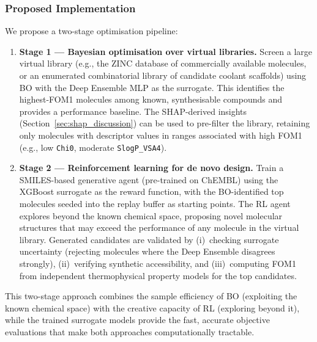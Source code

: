 \documentclass[11pt,a4paper]{article}
\begin{document}
\subsubsection{Proposed Implementation}

We propose a two-stage optimisation pipeline:
\begin{enumerate}
    \item \textbf{Stage 1 --- Bayesian optimisation over virtual libraries.} Screen a large virtual library (e.g., the ZINC database of commercially available molecules, or an enumerated combinatorial library of candidate coolant scaffolds) using BO with the Deep Ensemble MLP as the surrogate. This identifies the highest-FOM1 molecules among known, synthesisable compounds and provides a performance baseline. The SHAP-derived insights (Section~\ref{sec:shap_discussion}) can be used to pre-filter the library, retaining only molecules with descriptor values in ranges associated with high FOM1 (e.g., low \texttt{Chi0}, moderate \texttt{SlogP\_VSA4}).

    \item \textbf{Stage 2 --- Reinforcement learning for de novo design.} Train a SMILES-based generative agent (pre-trained on ChEMBL) using the XGBoost surrogate as the reward function, with the BO-identified top molecules seeded into the replay buffer as starting points. The RL agent explores beyond the known chemical space, proposing novel molecular structures that may exceed the performance of any molecule in the virtual library. Generated candidates are validated by (i)~checking surrogate uncertainty (rejecting molecules where the Deep Ensemble disagrees strongly), (ii)~verifying synthetic accessibility, and (iii)~computing FOM1 from independent thermophysical property models for the top candidates.
\end{enumerate}

This two-stage approach combines the sample efficiency of BO (exploiting the known chemical space) with the creative capacity of RL (exploring beyond it), while the trained surrogate models provide the fast, accurate objective evaluations that make both approaches computationally tractable.
\end{document}
